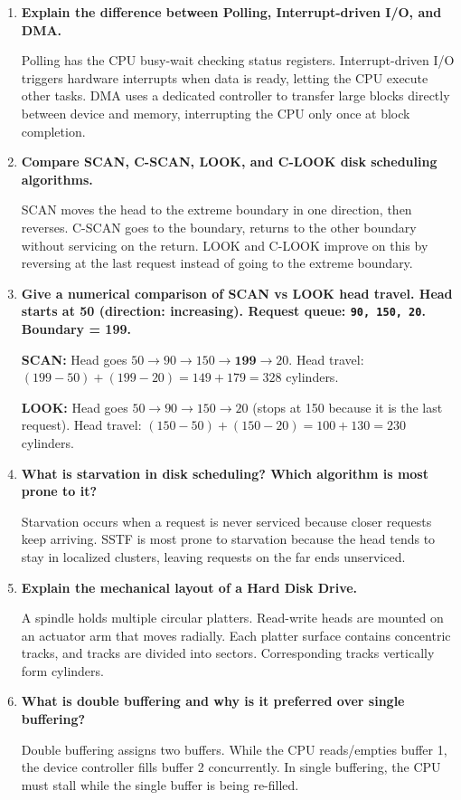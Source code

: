 \documentclass[12pt,a4paper]{article}
\newcommand{\Q}[1]{\textbf{#1}\par\noindent\ignorespaces}
\begin{document}
\begin{tcolorbox}[exambox, title={\textbf{Frequently Asked / Viva Questions}}]
\begin{enumerate}[topsep=0pt, label=\textbf{Q\arabic*.}, itemsep=5pt]
  \item \Q{Explain the difference between Polling, Interrupt-driven I/O, and DMA.}
    Polling has the CPU busy-wait checking status registers. Interrupt-driven I/O triggers hardware interrupts when data is ready, letting the CPU execute other tasks. DMA uses a dedicated controller to transfer large blocks directly between device and memory, interrupting the CPU only once at block completion.
  \item \Q{Compare SCAN, C-SCAN, LOOK, and C-LOOK disk scheduling algorithms.}
    SCAN moves the head to the extreme boundary in one direction, then reverses. C-SCAN goes to the boundary, returns to the other boundary without servicing on the return. LOOK and C-LOOK improve on this by reversing at the last request instead of going to the extreme boundary.
  \item \Q{Give a numerical comparison of SCAN vs LOOK head travel. Head starts at 50 (direction: increasing). Request queue: \texttt{90, 150, 20}. Boundary = 199.}
    \textbf{SCAN:} Head goes $50 \to 90 \to 150 \to \mathbf{199} \to 20$. Head travel: $(199 - 50) + (199 - 20) = 149 + 179 = 328$ cylinders.\par
    \textbf{LOOK:} Head goes $50 \to 90 \to 150 \to 20$ (stops at 150 because it is the last request). Head travel: $(150 - 50) + (150 - 20) = 100 + 130 = 230$ cylinders.
  \item \Q{What is starvation in disk scheduling? Which algorithm is most prone to it?}
    Starvation occurs when a request is never serviced because closer requests keep arriving. SSTF is most prone to starvation because the head tends to stay in localized clusters, leaving requests on the far ends unserviced.
  \item \Q{Explain the mechanical layout of a Hard Disk Drive.}
    A spindle holds multiple circular platters. Read-write heads are mounted on an actuator arm that moves radially. Each platter surface contains concentric tracks, and tracks are divided into sectors. Corresponding tracks vertically form cylinders.
  \item \Q{What is double buffering and why is it preferred over single buffering?}
    Double buffering assigns two buffers. While the CPU reads/empties buffer 1, the device controller fills buffer 2 concurrently. In single buffering, the CPU must stall while the single buffer is being re-filled.

\end{enumerate}
\end{tcolorbox}
\end{document}
